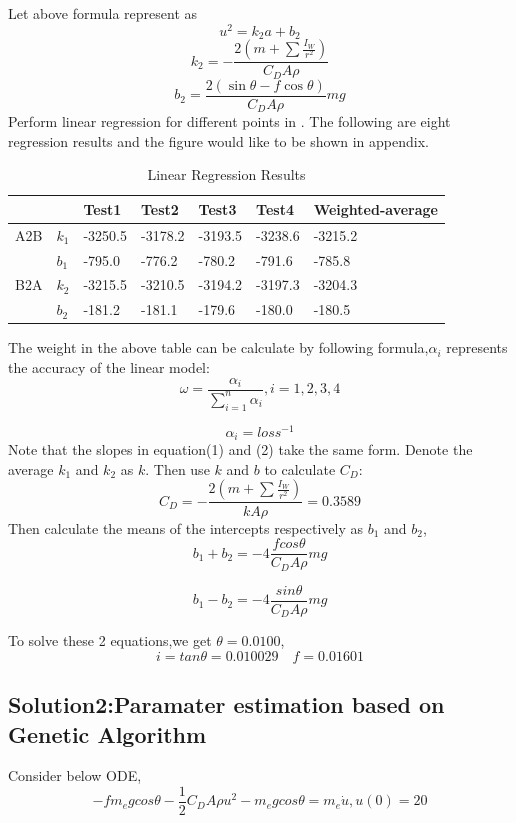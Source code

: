 \documentclass[UTF8,a4paper,11pt]{article}
\begin{document}
Let above formula represent as $$u^2=k_{2} a+b_{2}$$
$$
k_2 = -\frac{2\left(m+\sum \frac{I_{W}}{r^{2}}\right)}{C_{D} A \rho}
$$
$$
b_2 = \frac{2(\sin \theta-f \cos \theta)}{C_{D} A \rho} m g
$$
Perform linear regression for different points in . The following are eight regression results and the figure would like to be shown in appendix.
\begin{table}[!ht]
    \centering
    \caption{Linear Regression Results}
    \begin{tabular}{lllllll}
    \toprule[1.5pt]
        ~ & ~ & Test1 & Test2 & Test3 & Test4 & Weighted-average \\ 
        \midrule[0.75pt]
        A2B & $k_1$ & -3250.5 & -3178.2 & -3193.5 & -3238.6 & -3215.2 \\ 
        ~ & $b_1$ & -795.0 & -776.2 & -780.2 & -791.6 & -785.8 \\ 
        B2A & $k_2$ & -3215.5 & -3210.5 & -3194.2 & -3197.3 & -3204.3 \\ 
        ~ & $b_2$ & -181.2 & -181.1 & -179.6 & -180.0 & -180.5 \\ 
        \bottomrule[1.5pt]
    \end{tabular}
\end{table}
The weight in the above table can be calculate by following formula,$\alpha_i$ represents the accuracy of the linear model:
\begin{equation}
\omega = \frac{\alpha_i }{\sum_{i=1}^{n} \alpha_i} ,i=1,2,3,4
\end{equation}

$$
\alpha_i = loss^{-1}
$$
Note that the slopes in equation(1) and (2) take the same form. Denote the average $k_1$ and $k_2$ as $k$. 
Then use $k$ and $b$ to calculate $C_D$:
$$
C_D = -\frac{2\left(m+\sum \frac{I_{W}}{r^{2}}\right)}{k A \rho} = 0.3589
$$
Then calculate the means of the intercepts respectively as $b_1$ and $b_2$,
$$
b_1 + b_2 = -4\frac{fcos\theta}{C_DA\rho}mg
$$

$$
b_1 - b_2 = -4\frac{sin\theta}{C_DA\rho}mg
$$

To solve these 2 equations,we get $\theta = 0.0100$,
$$
i = tan \theta = 0.010029 \quad f = 0.01601
$$

\subsection{Solution2:Paramater estimation based on Genetic Algorithm}

Consider below ODE,
\begin{equation}
 -fm_egcos\theta-\frac{1}{2}C_DA\rho u^2-m_egcos\theta = m_e\dot{u},
 u(0) = 20
\end{equation}
\end{document}
